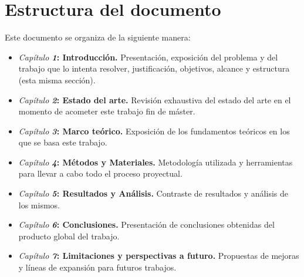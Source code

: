 \section{Estructura del documento}
Este documento se organiza de la siguiente manera:
\begin{itemize}
    \item \emph{Capítulo \textbf{1}}\textbf{: Introducción.} Presentación, exposición del problema y del trabajo que lo intenta resolver, justificación, objetivos, alcance y estructura (esta misma sección).
    \item \emph{Capítulo \textbf{2}}\textbf{: Estado del arte.} Revisión exhaustiva del estado del arte en el momento de acometer este trabajo fin de máster.
    \item \emph{Capítulo \textbf{3}}\textbf{: Marco teórico.} Exposición de los fundamentos teóricos en los que se basa este trabajo.
    \item \emph{Capítulo \textbf{4}}\textbf{: Métodos y Materiales.} Metodología utilizada y herramientas para llevar a cabo todo el proceso proyectual.
    \item \emph{Capítulo \textbf{5}}\textbf{: Resultados y Análisis.} Contraste de resultados y análisis de los mismos.
    \item \emph{Capítulo \textbf{6}}\textbf{: Conclusiones.} Presentación de conclusiones obtenidas del producto global del trabajo.
    \item \emph{Capítulo \textbf{7}}\textbf{: Limitaciones y perspectivas a futuro.} Propuestas de mejoras y líneas de expansión para futuros trabajos.
\end{itemize}